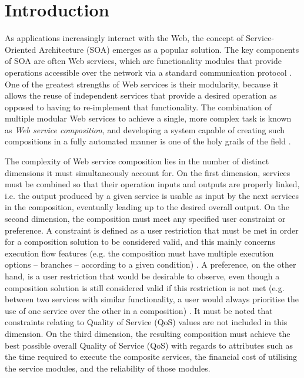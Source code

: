 \documentclass[conference]{IEEEtran}
\begin{document}
\IEEEpeerreviewmaketitle


\section{Introduction}

As applications increasingly interact with the Web, the concept of Service-Oriented Architecture (SOA) \cite{perrey2003service}
emerges as a popular solution. The key components of SOA are often Web services, which are functionality modules that
provide operations accessible over the network via a standard communication protocol \cite{gottschalk2002introduction}. One of the greatest
strengths of Web services is their modularity, because it allows the reuse of independent services that provide a
desired operation as opposed to having to re-implement that functionality. The combination of multiple modular Web services
to achieve a single, more complex task is known as \textit{Web service composition}, and developing a system capable of 
creating such compositions in a fully automated manner is one of the holy grails of the field \cite{milanovic2004current}.

The complexity of Web service composition lies in the number of distinct dimensions it must simultaneously account for. On
the first dimension, services must be combined so that their operation inputs and outputs are properly linked, i.e. the output
produced by a given service is usable as input by the next services in the composition, eventually leading up to the desired overall
output. On the second dimension, the composition must meet any specified user constraint or preference. A constraint is defined as a user restriction that must
be met in order for a composition solution to be considered valid, and this mainly concerns execution flow features (e.g. the composition must have
multiple execution options -- branches -- according to a given condition) \cite{wang2014automated,sohrabi2009web,karakoc2009composing}. A preference, on the other hand, is a user restriction that would
be desirable to observe, even though a composition solution is still considered valid if this restriction is not met (e.g. between two services with similar
functionality, a user would always prioritise the use of one service over the other in a composition) \cite{wang2014automated}. It must be noted that constraints relating to Quality of Service (QoS) values are not included in this dimension. On the third dimension, the resulting composition must achieve the best possible
overall Quality of Service (QoS) with regards to attributes such as the time required to execute the composite services, the
financial cost of utilising the service modules, and the reliability of those modules.
\end{document}
